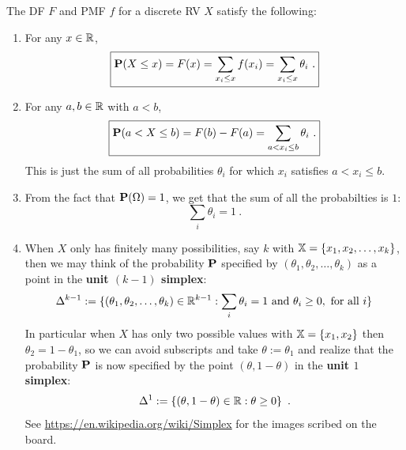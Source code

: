 The DF $F$ and PMF $f$ for a discrete RV $X$ satisfy the following:
\begin{enumerate}
\item  For any $x \in \mathbb{R}$, 
\begin{equation}\label{Eq:DiscreteDF}
\boxed{\mathbf{P}(X \leq x) = F(x)  = \sum_{x_i \leq x} f(x_i) = \sum_{x_i \leq x} \theta_i \ .}
\end{equation}
\item For any $a,b \in \mathbb{R}$ with $a<b$,
\begin{equation}\label{E:DRVFab}
\boxed{\mathbf{P}(a < X \leq b) = F(b) - F(a) = \sum_{a < x_i \leq b} \theta_i \ .}
\end{equation}
This is just the sum of all probabilities $\theta_i$ for which $x_i$ satisfies $a<x_i \leq b$. 
\item
From the fact that $\mathbf{P}(\Omega)=1$, we get that the sum of all the probabilties is $1$:
\begin{equation}\label{E:DRVsumofP}
\boxed{\sum_i \theta_i = 1 \ .}
\end{equation}
\item
When $X$ only has finitely many possibilities, say $k$ with $\mathbb{X} = \{x_1,x_2,\ldots,x_k\}$, then we may think of the probability $\mathbf{P}$ specified by $(\theta_1,\theta_2,\ldots,\theta_k)$ as a point in the \textbf{unit $(k-1)$ simplex}:
\begin{equation}\label{E:unitk-1simplex}
\Delta^{k-1} := \{ (\theta_1,\theta_2,\ldots,\theta_k) \in \mathbb{R}^{k-1} : \sum_i \theta_i = 1 \text{ and } \theta_i \geq 0, \text{ for all } i\}
\end{equation}
In particular when $X$ has only two possible values with $\mathbb{X} = \{x_1,x_2\}$ then $\theta_2=1-\theta_1$, so we can avoid subscripts and take $\theta := \theta_1$ and realize that the probability $\mathbf{P}$ is now specified by the point $(\theta,1-\theta)$ in the \textbf{unit $1$ simplex}:
\begin{equation}\label{E:unit1simplex}
\Delta^{1} := \{ (\theta,1-\theta) \in \mathbb{R} : \theta \geq 0 \} \enspace .
\end{equation}
See \url{https://en.wikipedia.org/wiki/Simplex} for the images scribed on the board.
\end{enumerate}

